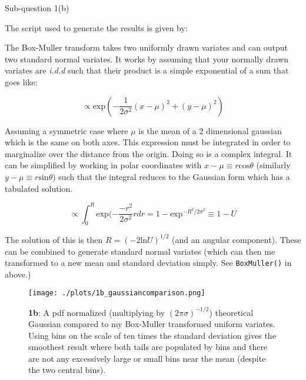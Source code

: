 \begin{subsection}{Sub-question 1(b)}

The script used to generate the results is given by:
  


The Box-Muller transform takes two uniformly drawn variates and can output two standard normal variates. It works by assuming that your normally drawn variates are \textit{i.d.d} such that their product is a simple exponential of a sum that goes like:

\begin{equation}
  \propto \text{exp}(-\frac{1}{2\sigma^2}(x-\mu)^2+(y-\mu)^2)
\end{equation}

Assuming a symmetric case where $\mu$ is the mean of a 2 dimensional gaussian which is the same on both axes. This expression must be integrated in order to marginalize over the distance from the origin. Doing so is a complex integral. It can be simplified by working in polar coordinates with $x-\mu \equiv r\text{cos}\theta$ (similarly $y-\mu \equiv r\text{sin}\theta$) such that the integral reduces to the Gaussian form which has a tabulated solution.

\begin{equation}
  \propto \int_0^R\text{exp}(-\frac{-r^2}{2\sigma^2}rdr = 1-\text{exp}^{-R^2/2\sigma^2} \equiv 1 - \textit{U}
\end{equation}

The solution of this is then $R=(-2\text{ln}\textit{U})^{1/2}$ (and an angular component). These can be combined to generate standard normal variates (which can then me transformed to a new mean and standard deviation simply. See \texttt{BoxMuller()} in  above.)

\begin{figure}[h!]
  \centering
  \texttt{[image: ./plots/1b\_gaussiancomparison.png]}
  \caption{\textbf{1b}: A pdf normalized (multiplying by $(2\pi\sigma)^{-1/2}$) theoretical Gaussian compared to my Box-Muller transformed uniform variates. Using bins on the scale of ten times the standard deviation gives the smoothest result where both tails are populated by bins and there are not any excessively large or small bins near the mean (despite the two central bins).}
  \label{fig:gaussiancomparison}
\end{figure}



\end{subsection}

